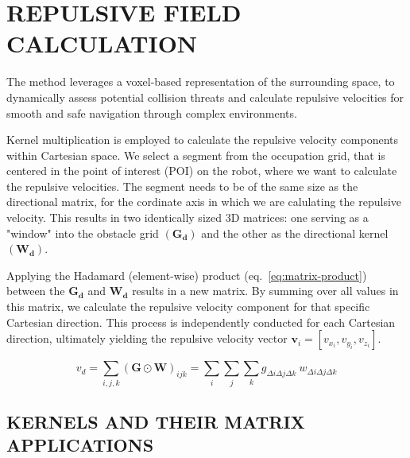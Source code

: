 \documentclass[letterpaper, 10 pt, conference]{ieeeconf}  %
\begin{document}
\section{REPULSIVE FIELD CALCULATION}
\label{section:repulsive_vel}

The method leverages a voxel-based representation of the surrounding space, to dynamically assess potential collision threats and calculate repulsive velocities for smooth and safe navigation through complex environments. 

Kernel multiplication is employed to calculate the repulsive velocity components within Cartesian space. We select a segment from the occupation grid, that is centered in the point of interest (POI) on the robot, where we want to calculate the repulsive velocities. The segment needs to be of the same size as the directional matrix, for the cordinate axis in which we are calulating the repulsive velocity. This results in two identically sized 3D matrices: one serving as a "window" into the obstacle grid $\mathbf{(G_d)}$ and the other as the directional kernel $\mathbf{(W_d)}$.

Applying the Hadamard (element-wise) product (eq.~\ref{eq:matrix-product}) between the $\mathbf{G_d}$ and $\mathbf{W_d}$ results in a new matrix. By summing over all values in this matrix, we calculate the repulsive velocity component for that specific Cartesian direction. This process is independently conducted for each Cartesian direction, ultimately yielding the repulsive velocity vector \(\mathbf{v}_i = [ v_{x_i}, v_{y_i}, v_{z_i}]\).

\begin{equation}
	v_d = \sum_{i,j,k} (\mathbf{G} \odot \mathbf{W})_{ijk} = \sum_{i}\sum_{j}\sum_{k} g_{\Delta i \Delta j \Delta k} ~  w_{\Delta i \Delta j \Delta k}
	\label{eq:matrix-product}
\end{equation}




\subsection{KERNELS AND THEIR MATRIX APPLICATIONS}
\end{document}
